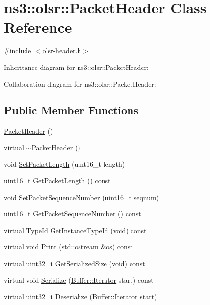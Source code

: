 \hypertarget{classns3_1_1olsr_1_1PacketHeader}{}\section{ns3\+:\+:olsr\+:\+:Packet\+Header Class Reference}
\label{classns3_1_1olsr_1_1PacketHeader}


{\ttfamily \#include $<$olsr-\/header.\+h$>$}



Inheritance diagram for ns3\+:\+:olsr\+:\+:Packet\+Header\+:


Collaboration diagram for ns3\+:\+:olsr\+:\+:Packet\+Header\+:
\subsection*{Public Member Functions}
\begin{DoxyCompactItemize}
\item 
\hyperlink{classns3_1_1olsr_1_1PacketHeader_a0a3b4d5e70f84feb6cd84631ee95dfbf}{Packet\+Header} ()
\item 
virtual \hyperlink{classns3_1_1olsr_1_1PacketHeader_a7840f63d73b524e551ac4e80ad20b866}{$\sim$\+Packet\+Header} ()
\item 
void \hyperlink{classns3_1_1olsr_1_1PacketHeader_a7ea01297e7d34574c4564a1f2cf4b85b}{Set\+Packet\+Length} (uint16\+\_\+t length)
\item 
uint16\+\_\+t \hyperlink{classns3_1_1olsr_1_1PacketHeader_a20586d2cda90b9a145ac3d8f4c9d7dd0}{Get\+Packet\+Length} () const 
\item 
void \hyperlink{classns3_1_1olsr_1_1PacketHeader_a10f2d8f92f43b0dfd014955667fff4a6}{Set\+Packet\+Sequence\+Number} (uint16\+\_\+t seqnum)
\item 
uint16\+\_\+t \hyperlink{classns3_1_1olsr_1_1PacketHeader_a9d3c58315151ad006e122d9b39f40032}{Get\+Packet\+Sequence\+Number} () const 
\item 
virtual \hyperlink{classns3_1_1TypeId}{Type\+Id} \hyperlink{classns3_1_1olsr_1_1PacketHeader_a53ff51528b1bb4b15907c94e86e19cb1}{Get\+Instance\+Type\+Id} (void) const 
\item 
virtual void \hyperlink{classns3_1_1olsr_1_1PacketHeader_a5ea9b23c06f192e62a0529777f270881}{Print} (std\+::ostream \&os) const 
\item 
virtual uint32\+\_\+t \hyperlink{classns3_1_1olsr_1_1PacketHeader_a58cc1688d4066443fc35384877dc79da}{Get\+Serialized\+Size} (void) const 
\item 
virtual void \hyperlink{classns3_1_1olsr_1_1PacketHeader_aebdcac4830836fcf459e55e4288d522e}{Serialize} (\hyperlink{classns3_1_1Buffer_1_1Iterator}{Buffer\+::\+Iterator} start) const 
\item 
virtual uint32\+\_\+t \hyperlink{classns3_1_1olsr_1_1PacketHeader_a9fb8deaa2721ccea252b25b62d6f66ef}{Deserialize} (\hyperlink{classns3_1_1Buffer_1_1Iterator}{Buffer\+::\+Iterator} start)
\end{DoxyCompactItemize}
